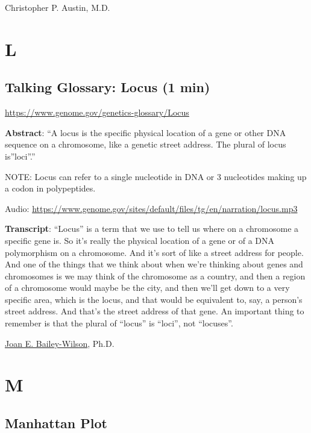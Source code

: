 \documentclass[
]{book}
\begin{document}
Christopher P. Austin, M.D.

\hypertarget{l}{%
\chapter{L}\label{l}}

\hypertarget{talking-glossary-locus-1-min}{%
\section{Talking Glossary: Locus (1 min)}\label{talking-glossary-locus-1-min}}

\url{https://www.genome.gov/genetics-glossary/Locus}

\textbf{Abstract}: ``A locus is the specific physical location of a gene or other DNA sequence on a chromosome, like a genetic street address. The plural of locus is''loci''.''

NOTE: Locus can refer to a single nucleotide in DNA or 3 nucleotides making up a codon in polypeptides.

Audio: \url{https://www.genome.gov/sites/default/files/tg/en/narration/locus.mp3}

\textbf{Transcript}: ``Locus'' is a term that we use to tell us where on a chromosome a specific gene is. So it's really the physical location of a gene or of a DNA polymorphism on a chromosome. And it's sort of like a street address for people. And one of the things that we think about when we're thinking about genes and chromosomes is we may think of the chromosome as a country, and then a region of a chromosome would maybe be the city, and then we'll get down to a very specific area, which is the locus, and that would be equivalent to, say, a person's street address. And that's the street address of that gene. An important thing to remember is that the plural of ``locus'' is ``loci'', not ``locuses''.

\href{https://www.genome.gov/staff/Joan-E-Bailey-Wilson-PhD}{Joan E. Bailey-Wilson}, Ph.D.

\hypertarget{m}{%
\chapter{M}\label{m}}

\hypertarget{manhattan-plot}{%
\section{Manhattan Plot}\label{manhattan-plot}}
\end{document}
